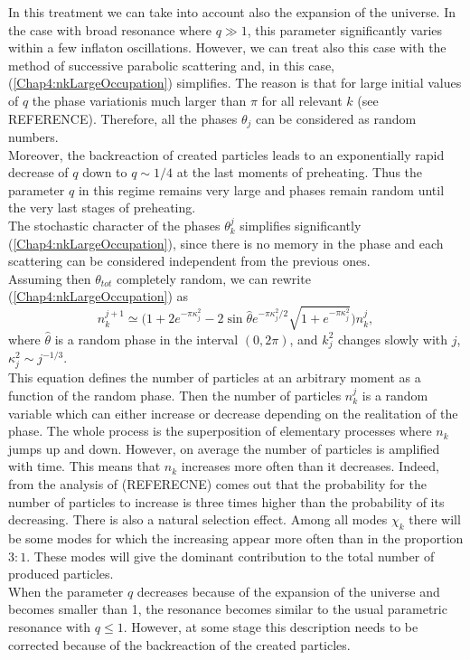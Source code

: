 \documentclass[11pt,a4paper,twoside]{book}
\begin{document}
In this treatment we can take into account also the expansion of the universe. In the case with broad resonance where $ q\gg 1 $, this parameter significantly varies within a few inflaton oscillations. However, we can treat also this case with the method of successive parabolic scattering and, in this case, (\ref{Chap4:nkLargeOccupation}) simplifies. The reason is that for large initial values of $ q $ the phase variationis much larger than $ \pi  $ for all relevant $ k $ (see REFERENCE). Therefore, all the phases $ \theta_{j} $ can be considered as random numbers.\\
Moreover, the backreaction of created particles leads to an exponentially rapid decrease of $ q $ down to $ q \sim 1/4 $ at the last moments of preheating. Thus the parameter $ q $ in this regime remains very large and phases remain random until the very last stages of preheating.\\
The stochastic character of the phases $ \theta_{k}^{j} $ simplifies significantly (\ref{Chap4:nkLargeOccupation}), since there is no memory in the phase and each scattering can be considered  independent from the previous ones.\\ 
Assuming then $\theta_{tot}$ completely random, we can rewrite (\ref{Chap4:nkLargeOccupation}) as
\begin{equation}
\label{Chap4:numberkRandom}
	n_{k}^{j+1} \simeq \Bigg(1 + 2 e^{-\pi\kappa_{j}^{2}} -2\sin\hat{\theta}e^{-\pi\kappa_{j}^{2}/2}\sqrt{1+e^{-\pi\kappa_{j}^{2}}}\Bigg)n_{k}^{j},
\end{equation}
where $\hat{\theta}$ is a random phase in the interval $ (0,2\pi) $, and $ k_{j}^{2} $ changes slowly with $ j $, $\kappa_{j}^{2} \sim j^{-1/3}$.\\
This equation defines the number of particles at an arbitrary moment as a function of the random phase. Then the number of particles $ n_{k}^{j} $ is a random variable which can either increase or decrease depending on the realitation of the phase. The whole process is the superposition of elementary processes where $ n_{k} $ jumps up and down. However, on average the number of particles is amplified with time. This means that $ n_{k} $ increases more often than it decreases. Indeed, from the analysis of (REFERECNE) comes out that the probability for the number of particles to increase is three times higher than the probability of its decreasing. There is also a natural selection effect. Among all modes $ \chi_{k} $ there will be some modes for which the increasing appear more often than in the proportion $ 3:1 $. These modes will give the dominant contribution to the total number of produced particles.\\
When the parameter $ q $ decreases because of the expansion of the universe and becomes smaller than 1, the resonance becomes similar to the usual parametric resonance with $ q\le 1 $. However, at some stage this description needs to be corrected because of the backreaction of the created particles.
\end{document}
